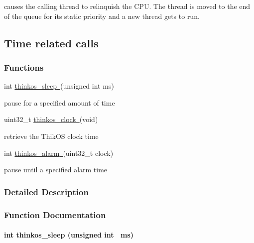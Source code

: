 {{causes the calling thread to relinquish the CPU. The thread is moved to
the end of the queue for its static priority and a new thread gets to
run. }

\paragraph{\texorpdfstring{{}}{}}\label{section}

\subsection{\texorpdfstring{{Time related
calls}}{Time related calls}}\label{time-related-calls}

\subsubsection{\texorpdfstring{{Functions}}{Functions}}\label{h.3rdcrjn}

{int
}{\protect\hyperlink{h.26in1rg}{thinkos\_sleep}}{\protect\hyperlink{h.26in1rg}{~}}{(unsigned
int ms)}

{pause for a specified amount of time }

{uint32\_t
}{\protect\hyperlink{h.lnxbz9}{thinkos\_clock}}{\protect\hyperlink{h.lnxbz9}{~}}{(void)}

{retrieve the ThikOS clock time }

{int
}{\protect\hyperlink{h.35nkun2}{thinkos\_alarm}}{\protect\hyperlink{h.35nkun2}{~}}{(uint32\_t
clock)}

{pause until a specified alarm time }

{}

\subsubsection{\texorpdfstring{{Detailed
Description}}{Detailed Description}}\label{detailed-description-1}

{}

{}

\subsubsection{\texorpdfstring{{Function
Documentation}}{Function Documentation}}\label{function-documentation-1}

\paragraph{\texorpdfstring{{int thinkos\_sleep (unsigned int
~ms)}}{int thinkos\_sleep (unsigned int ~ms)}}\label{int-thinkos_sleep-unsigned-int-ms}

}
